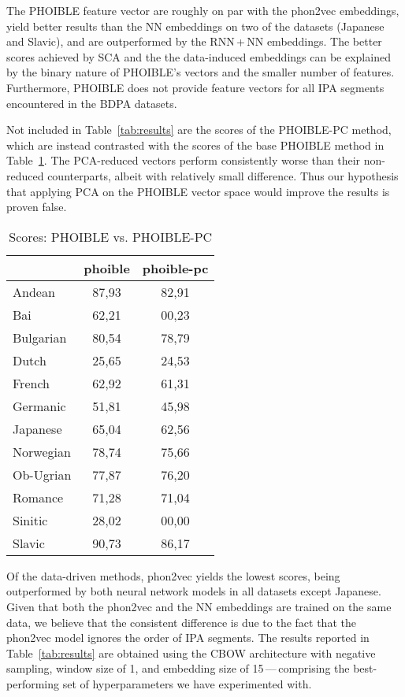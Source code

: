 \documentclass[a4paper]{report}
\begin{document}
The PHOIBLE feature vector are roughly on par with the phon2vec embeddings,
yield better results than the NN embeddings on two of the datasets (Japanese and Slavic), and are outperformed by the RNN\,+\,NN embeddings.
The better scores achieved by SCA and the the data-induced embeddings can be explained by the binary nature of PHOIBLE's vectors and the smaller number of features.
Furthermore, PHOIBLE does not provide feature vectors for all IPA segments encountered in the BDPA datasets.

Not included in Table~\ref{tab:results} are the scores of the PHOIBLE-PC method,
which are instead contrasted with the scores of the base PHOIBLE method in Table~\ref{tab:phoible}.
The PCA-reduced vectors perform consistently worse than their non-reduced counterparts, albeit with relatively small difference.
Thus our hypothesis that applying PCA on the PHOIBLE vector space would improve the results is proven false.

\begin{table}[h]
	\centering\small
	\begin{tabular}{l *{2}{c}}
		\toprule
		& phoible & phoible-pc \\
		\midrule
		Andean		&	87,93 &	82,91 \\
		Bai			&	62,21 &	00,23 \\
		Bulgarian	&	80,54 &	78,79 \\
		Dutch		&	25,65 &	24,53 \\
		French		&	62,92 &	61,31 \\
		Germanic	&	51,81 &	45,98 \\
		Japanese	&	65,04 &	62,56 \\
		Norwegian	&	78,74 &	75,66 \\
		Ob-Ugrian	&	77,87 &	76,20 \\
		Romance		&	71,28 &	71,04 \\
		Sinitic		&	28,02 &	00,00 \\
		Slavic		&	90,73 &	86,17 \\
		\bottomrule
	\end{tabular}
	\caption{Scores: PHOIBLE vs. PHOIBLE-PC}
	\label{tab:phoible}
\end{table}

Of the data-driven methods, phon2vec yields the lowest scores, being outperformed by both neural network models in all datasets except Japanese.
Given that both the phon2vec and the NN embeddings are trained on the same data,
we believe that the consistent difference is due to the fact that the phon2vec model ignores the order of IPA segments.
The results reported in Table~\ref{tab:results} are obtained using
the CBOW architecture with negative sampling, window size of 1, and embedding size of 15\,---\,comprising
the best-performing set of hyperparameters we have experimented with.
\end{document}
